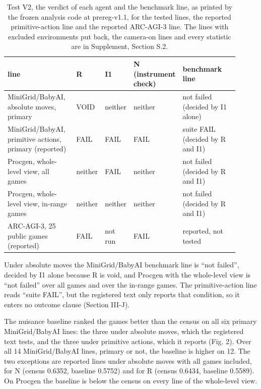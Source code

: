 \documentclass[journal]{IEEEtran}
\begin{document}
\begin{table}[!t]
\caption{Test V2, the verdict of each agent and the benchmark line, as printed by
the frozen analysis code at prereg-v1.1, for the tested lines, the
reported primitive-action line and the reported ARC-AGI-3 line. The
lines with excluded environments put back, the camera-on lines and every
statistic are in Supplement, Section S.2.}
\centering
\footnotesize
\renewcommand{\arraystretch}{1.15}
\setlength{\tabcolsep}{4pt}
\begin{tabular}{>{\raggedright\arraybackslash}p{0.322\linewidth}>{\raggedright\arraybackslash}p{0.082\linewidth}>{\raggedright\arraybackslash}p{0.082\linewidth}>{\raggedright\arraybackslash}p{0.124\linewidth}>{\raggedright\arraybackslash}p{0.301\linewidth}}
\hline
\textbf{line} & \textbf{R} & \textbf{I1} & \textbf{N (instrument check)} & \textbf{benchmark line} \\ \hline
MiniGrid/BabyAI, absolute moves, primary & VOID & neither & neither & not failed (decided by I1 alone) \\
MiniGrid/BabyAI, primitive actions, primary (reported) & FAIL & FAIL & FAIL & suite FAIL (decided by R and I1) \\
Procgen, whole-level view, all games & neither & FAIL & neither & not failed (decided by R and I1) \\
Procgen, whole-level view, in-range games & neither & neither & neither & not failed (decided by R and I1) \\
ARC-AGI-3, 25 public games (reported) & FAIL & not run & FAIL & reported, not tested \\
\hline
\end{tabular}
\end{table}

Under absolute moves the MiniGrid/BabyAI benchmark line is ``not
failed'', decided by I1 alone because R is void, and Procgen with the
whole-level view is ``not failed'' over all games and over the in-range
games. The primitive-action line reads ``suite FAIL'', but the
registered text only reports that condition, so it enters no outcome
clause (Section III-J).

The nuisance baseline ranked the games better than the census on all six
primary MiniGrid/BabyAI lines: the three under absolute moves, which the
registered text tests, and the three under primitive actions, which it
reports (Fig. 2). Over all 14 MiniGrid/BabyAI lines, primary or not, the
baseline is higher on 12. The two exceptions are reported lines under
absolute moves with all games included, for N (census 0.6352, baseline
0.5752) and for R (census 0.6434, baseline 0.5589). On Procgen the
baseline is below the census on every line of the whole-level view.
\end{document}
